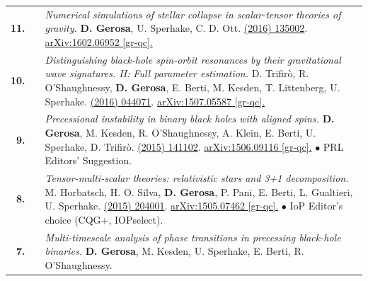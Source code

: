 {\begin{longtable}{rp{0.3cm}p{15.8cm}}
%
\textbf{11.} & & \textit{Numerical simulations of stellar collapse in scalar-tensor theories of gravity.}
\newline{}
\textbf{D. Gerosa}, U. Sperhake, C. D. Ott.
\newline{}
\href{http://dx.doi.org/10.1088/0264-9381/33/13/135002}{\cqg 33 (2016) 135002}. \href{https://arxiv.org/abs/1602.06952}{arXiv:1602.06952 [gr-qc].}
\vspace{0.09cm}\\
%
\textbf{10.} & & \textit{Distinguishing black-hole spin-orbit resonances by their gravitational wave signatures. II: Full parameter estimation.}
\newline{}
D. Trifir\`o, R. O'Shaughnessy, \textbf{D. Gerosa}, E. Berti, M. Kesden, T. Littenberg, U. Sperhake.
\newline{}
\href{http://dx.doi.org/10.1103/PhysRevD.93.044071}{\prd 93 (2016) 044071}. \href{https://arxiv.org/abs/1507.05587}{arXiv:1507.05587 [gr-qc].}
\vspace{0.09cm}\\
%
\textbf{9.} & & \textit{Precessional instability in binary black holes with aligned spins.}
\newline{}
\textbf{D. Gerosa}, M. Kesden, R. O'Shaughnessy, A. Klein, E. Berti, U. Sperhake, D. Trifir\`o.
\newline{}
\href{http://dx.doi.org/10.1103/PhysRevLett.115.141102}{\prl 115 (2015) 141102}. \href{https://arxiv.org/abs/1506.09116}{arXiv:1506.09116 [gr-qc].}
\newline{}
\textcolor{color1}{$\bullet$} PRL Editors' Suggestion.
\vspace{0.09cm}\\
%
\textbf{8.} & & \textit{Tensor-multi-scalar theories: relativistic stars and 3+1 decomposition.}
\newline{}
M. Horbatsch, H. O. Silva, \textbf{D. Gerosa}, P. Pani,  E. Berti, L. Gualtieri, U. Sperhake.
\newline{}
\href{http://dx.doi.org/10.1088/0264-9381/32/20/204001}{\cqg 32 (2015) 204001}. \href{https://arxiv.org/abs/1505.07462}{arXiv:1505.07462 [gr-qc].}
\newline{}
\textcolor{color1}{$\bullet$} IoP Editor's choice (CQG+, IOPselect).
\vspace{0.09cm}\\
%
\textbf{7.} & & \textit{Multi-timescale analysis of phase transitions in precessing black-hole binaries.}
\newline{}
\textbf{D. Gerosa}, M. Kesden, U. Sperhake, E. Berti, R. O'Shaughnessy.

\end{longtable}}
